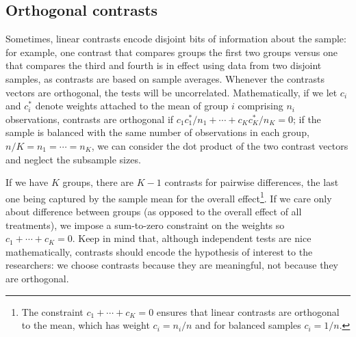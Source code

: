 \documentclass[
  11pt,
  letterpaper,
]{scrbook}
\theoremstyle{definition}
\theoremstyle{remark}
\begin{document}
\hypertarget{orthogonal-contrasts}{%
\subsection{Orthogonal contrasts}\label{orthogonal-contrasts}}

Sometimes, linear contrasts encode disjoint bits of information about
the sample: for example, one contrast that compares groups the first two
groups versus one that compares the third and fourth is in effect using
data from two disjoint samples, as contrasts are based on sample
averages. Whenever the contrasts vectors are orthogonal, the tests will
be uncorrelated. Mathematically, if we let \(c_{i}\) and \(c^{*}_{i}\)
denote weights attached to the mean of group \(i\) comprising \(n_i\)
observations, contrasts are orthogonal if
\(c_{1}c^{*}_{1}/n_1 + \cdots + c_{K}c^{*}_K/n_K = 0\); if the sample is
balanced with the same number of observations in each group,
\(n/K = n_1 =\cdots = n_K\), we can consider the dot product of the two
contrast vectors and neglect the subsample sizes.

If we have \(K\) groups, there are \(K-1\) contrasts for pairwise
differences, the last one being captured by the sample mean for the
overall effect\footnote{The constraint \(c_1 + \cdots + c_K=0\) ensures
  that linear contrasts are orthogonal to the mean, which has weight
  \(c_i=n_i/n\) and for balanced samples \(c_i =1/n\).}. If we care only
about difference between groups (as opposed to the overall effect of all
treatments), we impose a sum-to-zero constraint on the weights so
\(c_1 + \cdots + c_K=0\). Keep in mind that, although independent tests
are nice mathematically, contrasts should encode the hypothesis of
interest to the researchers: we choose contrasts because they are
meaningful, not because they are orthogonal.
\end{document}
